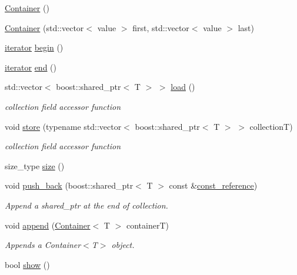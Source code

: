 \begin{DoxyCompactItemize}
\hyperlink{class_container_ab17ce1f67243b28abcd4c8113a72524c}{Container} ()
\item 
\hyperlink{class_container_a1ed1d5384e85f713e40bfb539e23c9ce}{Container} (std::vector$<$ value $>$ first, std::vector$<$ value $>$ last)
\item 
\hyperlink{class_container_afe880028d8304353129f47cd1d28c20a}{iterator} \hyperlink{class_container_ac5e2a75311f6e6a690ca67603490ddb1}{begin} ()
\item 
\hyperlink{class_container_afe880028d8304353129f47cd1d28c20a}{iterator} \hyperlink{class_container_a266eabe62963d6909d3aca7f105e203e}{end} ()
\item 
std::vector$<$ boost::shared\_\-ptr$<$ T $>$ $>$ \hyperlink{class_container_a9161a87726434f8955398137c647947c}{load} ()
\begin{DoxyCompactList}\small\item\em collection field accessor function \end{DoxyCompactList}\item 
void \hyperlink{class_container_a601371159ddfee9ab29b676207a0cf75}{store} (typename std::vector$<$ boost::shared\_\-ptr$<$ T $>$ $>$ collectionT)
\begin{DoxyCompactList}\small\item\em collection field accessor function \end{DoxyCompactList}\item 
size\_\-type \hyperlink{class_container_a842c3d9eca81b78b59112fde9707b091}{size} ()
\item 
void \hyperlink{class_container_a1f00050a4bd892699f05f8528afcea2e}{push\_\-back} (boost::shared\_\-ptr$<$ T $>$ const \&\hyperlink{class_container_a8dd7ae9d0687e11d873f98206e961ac1}{const\_\-reference})
\begin{DoxyCompactList}\small\item\em Append a shared\_\-ptr at the end of collection. \end{DoxyCompactList}\item 
void \hyperlink{class_container_a86d42cf807e073724bd2f8e08dcdfefa}{append} (\hyperlink{class_container}{Container}$<$ T $>$ containerT)
\begin{DoxyCompactList}\small\item\em Appends a Container$<$T$>$ object. \end{DoxyCompactList}\item 
bool \hyperlink{class_container_ad72379ee222b073a5eecec7fc1bedfc2}{show} ()
\item 

\end{DoxyCompactItemize}
